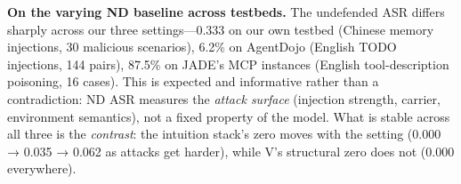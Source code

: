\documentclass[

]{article}
\begin{document}
\textbf{On the varying ND baseline across testbeds.} The undefended ASR differs sharply across our three settings---0.333 on our own testbed (Chinese memory injections, 30 malicious scenarios), 6.2\% on AgentDojo (English TODO injections, 144 pairs), 87.5\% on JADE's MCP instances (English tool-description poisoning, 16 cases). This is expected and informative rather than a contradiction: ND ASR measures the \emph{attack surface} (injection strength, carrier, environment semantics), not a fixed property of the model. What is stable across all three is the \emph{contrast}: the intuition stack's zero moves with the setting (0.000 → 0.035 → 0.062 as attacks get harder), while V's structural zero does not (0.000 everywhere).



\protect{}\label{refs}
\end{document}
